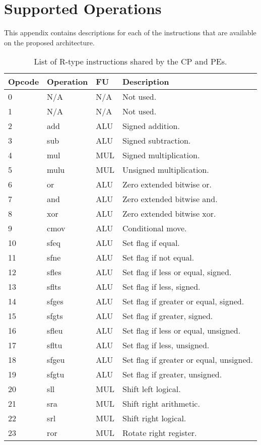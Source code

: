 \chapter{Supported Operations}\label{chapter:supported_operations}
This appendix contains descriptions for each of the instructions that are available on the proposed architecture.

\begin{table}[h]
\caption{List of R-type instructions shared by the CP and PEs.}
\begin{center}
\begin{tabular}{@{}p{}p{}p{}p{}@{}}
\toprule
\textbf{Opcode} & \textbf{Operation} & \textbf{FU} & \textbf{Description}\\ \hline
0 & N/A & N/A		& Not used. \\ 
1 & N/A & N/A		& Not used. \\ 
2 & add & ALU		& Signed addition. \\ 
3 & sub & ALU		& Signed subtraction. \\ 
4 & mul & MUL	& Signed multiplication. \\ 
5 & mulu & MUL	& Unsigned multiplication. \\ 
6 & or & ALU		& Zero extended bitwise or. \\ 
7 & and & ALU		& Zero extended bitwise and. \\ 
8 & xor & ALU	& Zero extended bitwise xor. \\ 
9 & cmov & ALU	& Conditional move. \\ 
10 & sfeq & ALU	& Set flag if equal. \\ 
11 & sfne & ALU	& Set flag if not equal. \\ 
12 & sfles & ALU	& Set flag if less or equal, signed. \\ 
13 & sflts & ALU	& Set flag if less, signed. \\ 
14 & sfges & ALU	& Set flag if greater or equal, signed. \\ 
15 & sfgts & ALU	& Set flag if greater, signed. \\ 
16 & sfleu & ALU	& Set flag if less or equal, unsigned. \\ 
17 & sfltu & ALU	& Set flag if less, unsigned. \\ 
18 & sfgeu & ALU	& Set flag if greater or equal, unsigned. \\ 
19 & sfgtu & ALU	& Set flag if greater, unsigned. \\ 
20 & sll & MUL	& Shift left logical. \\ 
21 & sra & MUL	& Shift right arithmetic. \\ 
22 & srl & MUL	& Shift right logical. \\ 
23 & ror & MUL	& Rotate right register. \\ 
\bottomrule
\end{tabular}
\end{center}
\label{table:r_ops}
\end{table}%

